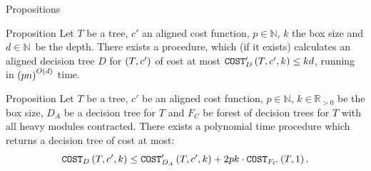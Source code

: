 \begin{frame}{Propositions}
\begin{block}{Proposition}
     Let $T$ be a tree, $c'$ an aligned cost function, $p\in \mathbb{N}$, $k$ the box size and $d\in \mathbb{N}$~be the depth. There exists a \FDP procedure, which (if it exists) calculates an aligned decision tree $D$ for $\left( T,c' \right)$ of cost at most $\texttt{COST}'_D\left( T,c',k \right)\leq kd$, running in $\left( pn \right)^{O\left( d \right)}$ time.
    \end{block}
\pause 
\begin{block}{Proposition}
     Let $T$ be a tree, $c'$ be an aligned cost function, $p\in \mathbb{N}$, $k\in \mathbb{R}_{>0}$ be the box size, $D_A$ be a decision tree for $T$ and $F_C$ be forest of decision trees for $T$ with all heavy modules contracted. There exists a polynomial time \FMergeDTs procedure which returns a decision tree of cost at most:
        $$
            \texttt{COST}_{D}\left( T,c',k \right)\leq\texttt{COST}'_{D_A}\left( T,c',k \right)+2pk\cdot \texttt{COST}_{F_C}\left( T,1 \right).
        $$
    \end{block}
\end{frame}

